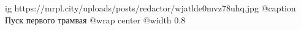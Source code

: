  
 
 
 
 

\ifcmt
  ig https://mrpl.city/uploads/posts/redactor/wjatlde0mvz78uhq.jpg
	@caption Пуск первого трамвая
  @wrap center
  @width 0.8
\fi
